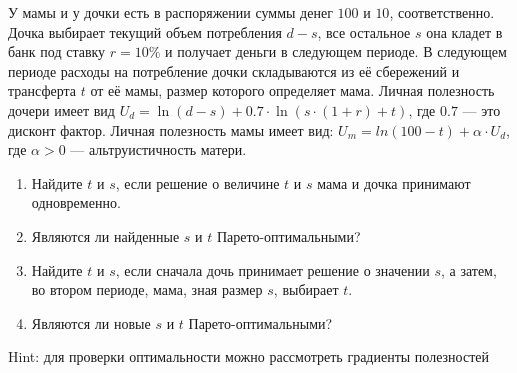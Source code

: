 \begin{problem}
\begin{source} \cite[3.11]{gintis:gte} \end{source}
У мамы и у дочки есть в распоряжении суммы денег  $100$  и  $10$, соответственно. Дочка выбирает текущий объем потребления $d-s$, все остальное $s$ она кладет в банк под ставку  $r=10\%$  и получает деньги в следующем периоде. В следующем периоде расходы на потребление дочки складываются из её сбережений и трансферта  $t$ от её мамы, размер которого определяет мама. Личная полезность дочери имеет вид  $U_{d} =\ln(d-s)+0.7\cdot \ln(s\cdot(1+r)+t)$, где  $0.7$  — это дисконт фактор. Личная полезность мамы имеет вид:  $U_{m} =ln(100-t)+\alpha \cdot U_{d} $, где  $\alpha >0$  — альтруистичность матери. \par
\begin{enumerate}
\item  Найдите $t$ и $s$, если решение о величине $t$ и $s$ мама и дочка принимают одновременно. \par
\item Являются ли найденные $s$ и $t$ Парето-оптимальными? \par
\item  Найдите $t$ и $s$, если сначала дочь принимает решение о значении $s$, а затем, во втором периоде, мама, зная размер $s$, выбирает $t$. \par
\item Являются ли новые $s$ и $t$ Парето-оптимальными? \par
\end{enumerate}
\begin{rem}
Hint: для проверки оптимальности можно рассмотреть градиенты полезностей \par
\end{rem}




\begin{sol}

\end{sol}
\end{problem}




